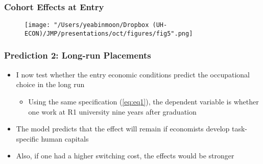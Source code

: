 \documentclass[11pt]{beamer}
\begin{document}
\begin{frame}
	\frametitle{Cohort Effects at Entry}
	\begin{figure}
		\centering
		\texttt{[image: "/Users/yeabinmoon/Dropbox (UH-ECON)/JMP/presentations/oct/figures/fig5".png]} 
	\end{figure}
	
\end{frame}



\begin{frame}
	\frametitle{Prediction 2: Long-run Placements}
	\begin{itemize}
		\item I now test whether the entry economic conditions predict the occupational choice in the long run
		\begin{itemize}
			\item Using the same specification (\ref{eq:eq1}), the dependent variable is whether one work at R1 university nine years after graduation
		\end{itemize}
	\vspace{2 mm}
		\item The model predicts that the effect will remain if economists develop task-specific human capitals 
	\vspace{2 mm}
		\item Also, if one had a higher switching cost, the effects would be stronger
	\end{itemize}
\end{frame}
\end{document}
